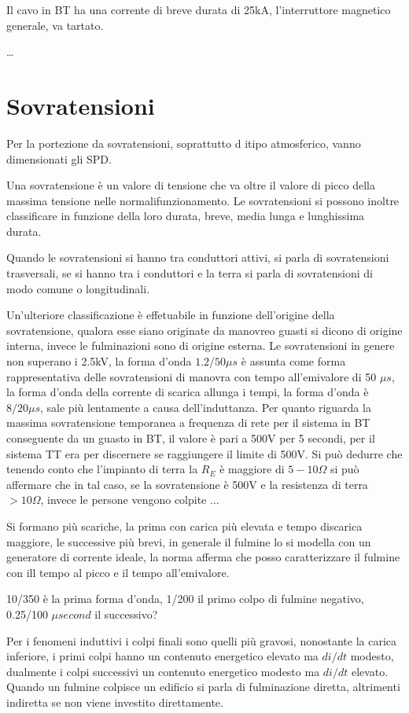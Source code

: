 Il cavo in BT ha una corrente di breve durata di 25kA, l'interruttore magnetico generale, va tartato.

\dots


\section{Sovratensioni}
Per la portezione da sovratensioni, soprattutto d itipo atmosferico, vanno dimensionati gli SPD.

Una sovratensione è un valore di tensione che va oltre il valore di picco della 
massima tensione nelle normalifunzionamento. Le sovratensioni si possono 
inoltre classificare in funzione della loro durata, breve, media lunga e 
lunghissima durata.

Quando le sovratensioni si hanno tra conduttori attivi, si parla di sovratensioni trasversali, se si hanno tra i conduttori e la terra si parla di sovratensioni di modo comune o longitudinali.

Un'ulteriore classificazione è effetuabile in funzione dell'origine della 
sovratensione, qualora esse siano originate da manovreo  guasti si dicono di 
origine interna, invece le fulminazioni sono di origine esterna.
Le sovratensioni in genere non superano i 2.5kV, la forma d'onda
$
1.2/50\mu s
$
è assunta come forma rappresentativa delle sovratensioni di manovra con tempo 
all'emivalore di 50 $\mu s$, la forma d'onda della corrente di scarica allunga 
i tempi, la forma d'onda è $8/20 \mu s$, sale più lentamente a causa 
dell'induttanza.
Per quanto riguarda la massima sovratensione temporanea a frequenza di rete per il sistema in BT conseguente da un guasto in BT, il valore è pari a 500V per 5 secondi, per il sistema TT era per discernere se raggiungere il limite di 500V.
Si può dedurre che tenendo conto che l'impianto di terra la $R_E$ è maggiore di $5-10 \Omega$ si può affermare che in tal caso, se la sovratensione è 500V e la resistenza di terra $>10\Omega$, invece le persone vengono colpite ...

Si formano più scariche, la prima con carica più elevata e tempo discarica maggiore, le successive più brevi, in generale il fulmine lo si modella con un generatore di corrente ideale, la norma afferma che posso caratterizzare il fulmine con ill tempo al picco e il tempo all'emivalore.

10/350 è la prima forma d'onda, 1/200 il primo colpo di fulmine negativo, 0.25/100 $\mu second$ il successivo?

Per i fenomeni induttivi i colpi finali sono quelli più gravosi, nonostante la 
carica inferiore, i primi colpi hanno un contenuto energetico elevato ma $di/dt$ modesto, dualmente i colpi successivi un contenuto energetico modesto ma 
$di/dt$ elevato. Quando un fulmine colpisce un edificio si parla di 
fulminazione diretta, altrimenti indiretta se non viene investito direttamente.

